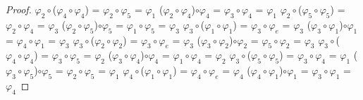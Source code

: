\documentclass[10pt,a4paper,oneside]{article}
\begin{document}
\begin{proof}
					\newline
					\newline
					$\varphi_{2}\circ$($\varphi_{4}\circ\varphi_{4}$) = $\varphi_{2}\circ\varphi_{5}$ = $\varphi_{1}$
					\newline
					($\varphi_{2}\circ\varphi_{4}$)$\circ\varphi_{4}$ = $\varphi_{3}\circ\varphi_{4}$ = $\varphi_{1}$
					\newline
					\newline
					$\varphi_{2}\circ$($\varphi_{5}\circ\varphi_{5}$) = $\varphi_{2}\circ\varphi_{4}$ = $\varphi_{3}$
					\newline
					($\varphi_{2}\circ\varphi_{5}$)$\circ\varphi_{5}$ = $\varphi_{1}\circ\varphi_{5}$ = $\varphi_{3}$
					\newline
					\newline
					$\varphi_{3}\circ$($\varphi_{1}\circ\varphi_{1}$) = $\varphi_{3}\circ\varphi_{e}$ = $\varphi_{3}$
					\newline
					($\varphi_{3}\circ\varphi_{1}$)$\circ\varphi_{1}$ = $\varphi_{4}\circ\varphi_{1}$ = $\varphi_{3}$
					\newline
					\newline
					$\varphi_{3}\circ$($\varphi_{2}\circ\varphi_{2}$) = $\varphi_{3}\circ\varphi_{e}$ = $\varphi_{3}$
					\newline
					($\varphi_{3}\circ\varphi_{2}$)$\circ\varphi_{2}$ = $\varphi_{5}\circ\varphi_{2}$ = $\varphi_{3}$
					\newline
					\newline
					$\varphi_{3}\circ$($\varphi_{4}\circ\varphi_{4}$) = $\varphi_{3}\circ\varphi_{5}$ = $\varphi_{2}$
					\newline
					($\varphi_{3}\circ\varphi_{4}$)$\circ\varphi_{4}$ = $\varphi_{1}\circ\varphi_{4}$ = $\varphi_{2}$
					\newline
					\newline
					$\varphi_{3}\circ$($\varphi_{5}\circ\varphi_{5}$) = $\varphi_{3}\circ\varphi_{4}$ = $\varphi_{1}$
					\newline
					($\varphi_{3}\circ\varphi_{5}$)$\circ\varphi_{5}$ = $\varphi_{2}\circ\varphi_{5}$ = $\varphi_{1}$
					\newline
					\newline
					$\varphi_{4}\circ$($\varphi_{1}\circ\varphi_{1}$) = $\varphi_{4}\circ\varphi_{e}$ = $\varphi_{4}$
					\newline
					($\varphi_{4}\circ\varphi_{1}$)$\circ\varphi_{1}$ = $\varphi_{3}\circ\varphi_{1}$ = $\varphi_{4}$

\end{proof}
\end{document}

